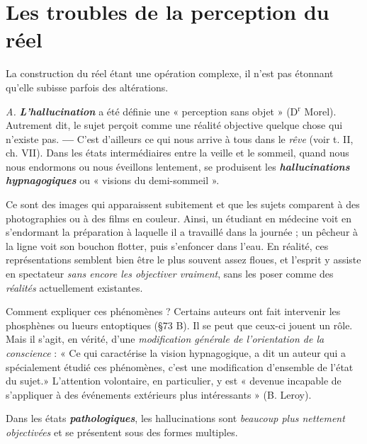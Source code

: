 \section{Les troubles de la perception du réel}%
La construction du réel étant une opération complexe, il n’est pas étonnant
qu’elle subisse parfois des altérations.

{\it A.} \textbf{\textit {L'hallucination}} a été définie une « perception sans objet »
(D$^\text{r}$ Morel). Autrement dit, le sujet perçoit comme une réalité objective
quelque chose qui n’existe pas. {\bf —} C’est d’ailleurs ce qui nous
arrive à tous dans le {\it rêve} (voir t. II, ch. VII). Dans les états intermédiaires
entre la veille et le sommeil, quand nous nous endormons ou
nous éveillons lentement, se produisent les \textbf{\textit {hallucinations hypnagogiques}}
ou « visions du demi-sommeil ».

\vspace{0.24cm}
{\footnotesize 
Ce sont des images qui apparaissent subitement et que les sujets comparent
à des photographies ou à des films en couleur. Ainsi, un étudiant en
médecine voit en s’endormant la préparation à laquelle il a travaillé dans la
journée ; un pêcheur à la ligne voit son bouchon flotter, puis s’enfoncer
dans l’eau. En réalité, ces représentations semblent bien être le plus souvent
assez floues, et l'esprit y assiste en spectateur {\it sans encore les objectiver
vraiment}, sans les poser comme des {\it réalités} actuellement existantes.}
\vspace{0.31cm}

Comment expliquer ces phénomènes ? Certains auteurs ont fait
intervenir les phosphènes ou lueurs entoptiques (\S 73 B). Il se peut
que ceux-ci jouent un rôle. Mais il s’agit, en vérité, d’une {\it modification
générale de l'orientation de la conscience} : « Ce qui caractérise la vision
hypnagogique, a dit un auteur qui a spécialement étudié ces phénomènes,
c’est une modification d’ensemble de l’état du sujet.» L’attention
volontaire, en particulier, y est « devenue incapable de s’appliquer
à des événements extérieurs plus intéressants » (B. Leroy).

Dans les états \textbf{\textit {pathologiques}}, les hallucinations sont {\it beaucoup
plus nettement objectivées} et se présentent sous des formes multiples.

